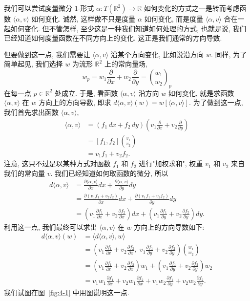 我们可以尝试度量微分 1-形式 $\alpha:T(\mathbb{R}^2)\to\mathbb{R}$ 如何变化的方式之一是转而考虑函数 $\langle\alpha,v\rangle$ 如何变化. 诚然, 这样做不只是度量 $\alpha$ 如何变化, 而是度量 $\langle\alpha,v\rangle$ 合在一起如何变化. 但不管怎样, 至少这是一种我们知道如何处理的方式, 也就是说, 我们已经知道如何度量函数在不同方向上的变化. 这正是我们通常的方向导数.

但要做到这一点, 我们需要让 $\langle\alpha,v\rangle$ 沿某个方向变化, 比如说沿方向 $w$. 同样, 为了简单起见, 我们选择 $w$ 为流形 $\mathbb{R}^2$ 上的常向量场, 
\[
w_p=w_1\frac{\partial}{\partial x}+w_2\frac{\partial}{\partial y}=\binom{w_1}{w_2}_{\!p}
\]
在每一点 $p\in\mathbb{R}^2$ 处成立. 于是, 看函数 $\langle\alpha,v\rangle$ 沿方向 $w$ 如何变化, 就是求函数 $\langle\alpha,v\rangle$ 在 $w$ 方向上的方向导数, 即求 $d\langle\alpha,v\rangle(w)=w[\langle\alpha,v\rangle]$. 为了做到这一点, 我们首先求出函数 $\langle\alpha,v\rangle$, 
\begin{align*}
\langle\alpha,v\rangle&=(f_1\,dx+f_2\,dy)\left(v_1\frac{\partial}{\partial x}+v_2\frac{\partial}{\partial y}\right)\\
&=[f_1,f_2]\binom{v_1}{v_2}\\
&=v_1f_1+v_2f_2.
\end{align*}
注意, 这只不过是以某种方式对函数 $f_1$ 和 $f_2$ 进行"加权求和", 权重 $v_1$ 和 $v_2$ 来自我们的常向量 $v$. 我们已经知道如何取函数的微分, 所以
\begin{align*}
d\langle\alpha,v\rangle&=\frac{\partial\langle\alpha,v\rangle}{\partial x}dx+\frac{\partial\langle\alpha,v\rangle}{\partial y}dy\\
&=\frac{\partial(v_1f_1+v_2f_2)}{\partial x}dx+\frac{\partial(v_1f_1+v_2f_2)}{\partial y}dy\\
&=\left(v_1\frac{\partial f_1}{\partial x}+v_2\frac{\partial f_2}{\partial x}\right)dx
+\left(v_1\frac{\partial f_1}{\partial y}+v_2\frac{\partial f_2}{\partial y}\right)dy.
\end{align*}
利用这一点, 我们最终可以求出 $\langle\alpha,v\rangle$ 在 $w$ 方向上的方向导数如下: 
\begin{align*}
d\langle\alpha,v\rangle(w)&=\bigl\langle d\langle\alpha,v\rangle,w\bigr\rangle\\
&=\left(v_1\frac{\partial f_1}{\partial x}+v_2\frac{\partial f_2}{\partial x},\;
v_1\frac{\partial f_1}{\partial y}+v_2\frac{\partial f_2}{\partial y}\right)\binom{w_1}{w_2}\\
&=\left(v_1\frac{\partial f_1}{\partial x}+v_2\frac{\partial f_2}{\partial x}\right)w_1
+\left(v_1\frac{\partial f_1}{\partial y}+v_2\frac{\partial f_2}{\partial y}\right)w_2\\
&=v_1w_1\frac{\partial f_1}{\partial x}+v_2w_1\frac{\partial f_2}{\partial x}
+v_1w_2\frac{\partial f_1}{\partial y}+v_2w_2\frac{\partial f_2}{\partial y}.
\end{align*}
我们试图在图~\ref{fig:4-1} 中用图说明这一点.

